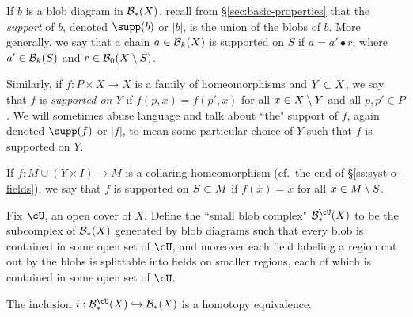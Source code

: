 \medskip

If $b$ is a blob diagram in ${\mathcal B}_*(X)$, recall from \S \ref{sec:basic-properties} that the {\it support} of $b$, denoted
$\supp(b)$ or $|b|$, is the union of the blobs of $b$.
More generally, we say that a chain $a\in {\mathcal B}_k(X)$ is supported on $S$ if
$a = a'\bullet r$, where $a'\in {\mathcal B}_k(S)$ and $r\in {\mathcal B}_0(X\setminus S)$.

Similarly, if $f: P\times X\to X$ is a family of homeomorphisms and $Y\subset X$, we say that $f$ is 
{\it supported on $Y$} if $f(p, x) = f(p', x)$ for all $x\in X\setminus Y$ and all $p,p'\in P$.
We will sometimes abuse language and talk about ``the" support of $f$,
again denoted $\supp(f)$ or $|f|$, to mean some particular choice of $Y$ such that
$f$ is supported on $Y$.

If $f: M \cup (Y\times I) \to M$ is a collaring homeomorphism
(cf.\ the end of \S \ref{ss:syst-o-fields}),
we say that $f$ is supported on $S\subset M$ if $f(x) = x$ for all $x\in M\setminus S$.

\medskip

Fix $\cU$, an open cover of $X$.
Define the ``small blob complex" $\bc^{\cU}_*(X)$ to be the subcomplex of ${\mathcal B}_*(X)$ 
generated by blob diagrams such that every blob is contained in some open set of $\cU$, 
and moreover each field labeling a region cut out by the blobs is splittable 
into fields on smaller regions, each of which is contained in some open set of $\cU$.

\begin{lemma} \label{small-blobs-b}  \label{thm:small-blobs}
The inclusion $i: \bc^{\cU}_*(X) \into \bc_*(X)$ is a homotopy equivalence.
\end{lemma}

